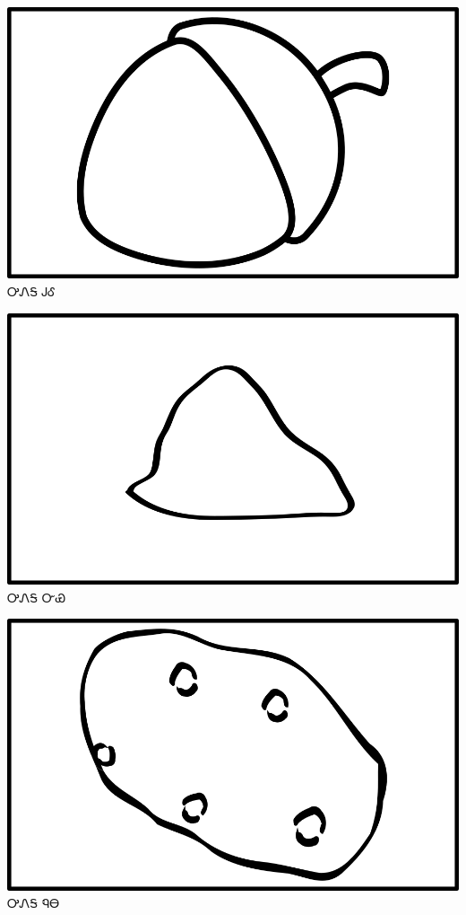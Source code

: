 \documentclass[avery5371]{flashcards}%
\begin{document}
    \begin{flashcard}{
        \includegraphics[width=0.95\columnwidth,height=.51\columnwidth,keepaspectratio]{../artwork/objects-neutral/gule}
    }
        \Huge ᎤᏁᎦ ᎫᎴ
    \end{flashcard}

    \begin{flashcard}{
        \includegraphics[width=0.95\columnwidth,height=.51\columnwidth,keepaspectratio]{../artwork/objects-neutral/nvya}
    }
        \Huge ᎤᏁᎦ ᏅᏯ
    \end{flashcard}

    \begin{flashcard}{
        \includegraphics[width=0.95\columnwidth,height=.51\columnwidth,keepaspectratio]{../artwork/objects-neutral/nuna}
    }
        \Huge ᎤᏁᎦ ᏄᎾ
    \end{flashcard}
\end{document}
